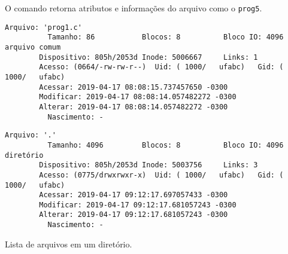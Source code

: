\documentclass[a4paper, 11pt, answers]{exam}
\begin{document}
\begin{questions}
\begin{parts}
      \begin{solution}
        O comando retorna atributos e informações do arquivo como o 
        \verb|prog5|.

        \begin{Verbatim}[label={\$ stat prog1.c}, fontsize=\small]
          Arquivo: 'prog1.c'
          Tamanho: 86           Blocos: 8          Bloco IO: 4096   arquivo comum
        Dispositivo: 805h/2053d Inode: 5006667     Links: 1
        Acesso: (0664/-rw-rw-r--)  Uid: ( 1000/   ufabc)   Gid: ( 1000/   ufabc)
        Acessar: 2019-04-17 08:08:15.737457650 -0300
        Modificar: 2019-04-17 08:08:14.057482272 -0300
        Alterar: 2019-04-17 08:08:14.057482272 -0300
          Nascimento: -
        \end{Verbatim}

        \begin{Verbatim}[label={\$ stat .}, fontsize=\small]
          Arquivo: '.'
          Tamanho: 4096         Blocos: 8          Bloco IO: 4096   diretório
        Dispositivo: 805h/2053d Inode: 5003756     Links: 3
        Acesso: (0775/drwxrwxr-x)  Uid: ( 1000/   ufabc)   Gid: ( 1000/   ufabc)
        Acessar: 2019-04-17 09:12:17.697057433 -0300
        Modificar: 2019-04-17 09:12:17.681057243 -0300
        Alterar: 2019-04-17 09:12:17.681057243 -0300
          Nascimento: -
        \end{Verbatim}
      \end{solution}
    \end{parts}

    \question
    Lista de arquivos em um diretório.

\end{questions}
\end{document}
